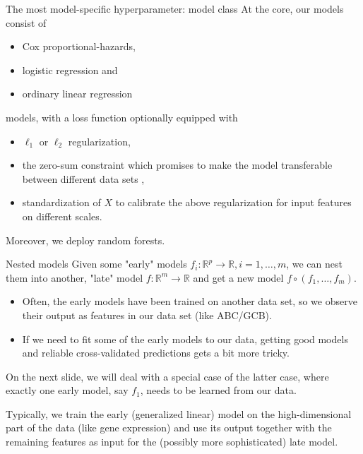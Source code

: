 \documentclass[10pt, aspectratio=169]{beamer}
\def\RR{\mathbb{R}}
\begin{document}
\begin{frame}{The most model-specific hyperparameter: model class}
  At the core, our models consist of 
  \begin{itemize}
    \item Cox proportional-hazards,
    \item logistic regression and 
    \item ordinary linear regression
  \end{itemize}
  models, with a loss function optionally equipped with
  \begin{itemize}
    \item $\ell_1$ or $\ell_2$ regularization,
    \item the zero-sum constraint which promises to make the model transferable
      between different data sets \cite{transplatform17},
    \item standardization of $X$ to calibrate the above regularization for input
      features on different scales.
  \end{itemize}

  Moreover, we deploy random forests.
\end{frame}

\begin{frame}{Nested models}
  Given some "early" models $f_i: \RR^p \to \RR, i = 1, \ldots, m$, we can nest 
  them into another, "late" model $f: \RR^m \to \RR$ and get a new model 
  $f \circ (f_1, \ldots, f_m)$.

  \begin{itemize}
    \item Often, the early models have been trained on another data set, so we 
      observe their output as features in our data set (like ABC/GCB).
    \item If we need to fit some of the early models to our data, getting good 
      models and reliable cross-validated predictions gets a bit more tricky. 
  \end{itemize}
  On the next slide, we will deal with a special case of the latter case, where 
  exactly one early model, say $f_1$, needs to be learned from our data.

  Typically, we train the early (generalized linear) model on the high-dimensional 
  part of the data (like gene expression) and use its output together with the 
  remaining features as input for the (possibly more sophisticated) late model.
\end{frame}
\end{document}
